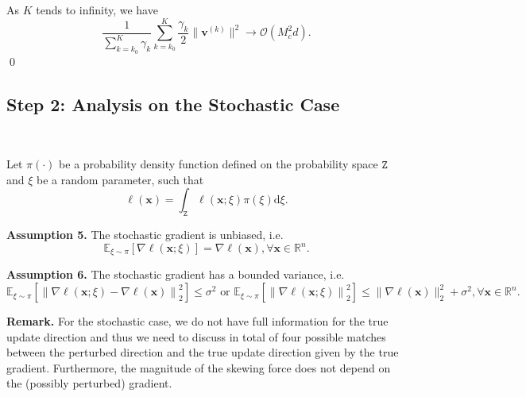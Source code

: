 \documentclass[10pt,a4paper]{article}
\begin{document}
As $K$ tends to infinity, we have \[\frac{1}{\sum_{k=k_0}^{K}\gamma_k}\sum\limits_{k=k_0}^{K}\frac{\gamma_k}{2}\|\mathbf{v}^{(k)}\|^2\longrightarrow\mathcal{O}(M_c^2d).\] \qed

\subsection{Step 2: Analysis on the Stochastic Case}\hfill\\

Let $\pi(\cdot)$ be a probability density function defined on the probability space $\mathtt{Z}$ and $\xi$ be a random parameter, such that
$$\ell(\mathbf{x})=\int_\mathtt{Z} \ell(\mathbf{x};\xi)\pi(\xi)\text{d}\xi.$$

\textbf{Assumption 5.} The stochastic gradient is unbiased, i.e. $$\mathbb{E}_{\xi\sim\pi}[\nabla\ell(\mathbf{x};\xi)]=\nabla\ell(\mathbf{x}),\forall \mathbf{x}\in \mathbb{R}^n.$$

\textbf{Assumption 6.} The stochastic gradient has a bounded variance, i.e. $$\mathbb{E}_{\xi\sim\pi}\left[\left\lVert\nabla \ell(\mathbf{x};\xi)-\nabla \ell(\mathbf{x})\right\rVert^2_2\right]\leq\sigma^2 \text{ or }\mathbb{E}_{\xi\sim\pi}\left[\left\lVert\nabla \ell(\mathbf{x};\xi)\right\rVert^2_2\right]\leq \lVert\nabla \ell(\mathbf{x})\rVert^2_2+\sigma^2,\forall \mathbf{x}\in \mathbb{R}^n.$$


\textbf{Remark.} For the stochastic case, we do not have full information for the true update direction and thus we need to discuss in total of four possible matches between the perturbed direction and the true update direction given by the true gradient. Furthermore, the magnitude of the skewing force does not depend on the (possibly perturbed) gradient.
\end{document}
